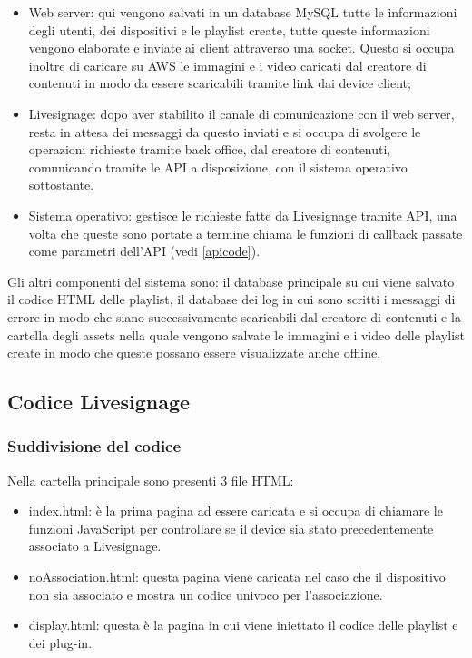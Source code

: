 \begin{itemize}
    \item Web server: qui vengono salvati in un database MySQL tutte le informazioni degli utenti, dei dispositivi e le playlist create, tutte queste informazioni vengono elaborate e inviate ai client attraverso una socket. Questo si occupa inoltre di caricare su AWS le immagini e i video caricati dal creatore di contenuti in modo da essere scaricabili tramite link dai device client;
    \item Livesignage: dopo aver stabilito il canale di comunicazione con il web server, resta in attesa dei messaggi da questo inviati e si occupa di svolgere le operazioni richieste tramite back office, dal creatore di contenuti, comunicando tramite le API a disposizione, con il sistema operativo sottostante.
    \item Sistema operativo: gestisce le richieste fatte da Livesignage tramite API, una volta che queste sono portate a termine chiama le funzioni di callback passate come parametri dell'API (vedi \ref*{apicode}).
\end{itemize}

Gli altri componenti del sistema sono: il database principale su cui viene salvato il codice HTML delle playlist, il database dei log in cui sono scritti i messaggi di errore in modo che siano successivamente scaricabili dal creatore di contenuti e la cartella degli assets nella quale vengono salvate le immagini e i video delle playlist create in modo che queste possano essere visualizzate anche offline.

\subsection{Codice Livesignage}

\subsubsection{Suddivisione del codice}

Nella cartella principale sono presenti 3 file HTML: 
\begin{itemize}
    \item index.html: è la prima pagina ad essere caricata e si occupa di chiamare le funzioni JavaScript per controllare se il device sia stato precedentemente associato a Livesignage.
    \item noAssociation.html: questa pagina viene caricata nel caso che il dispositivo non sia associato e mostra un codice univoco per l'associazione.
    \item display.html: questa è la pagina in cui viene iniettato il codice delle playlist e dei plug-in.
\end{itemize}

